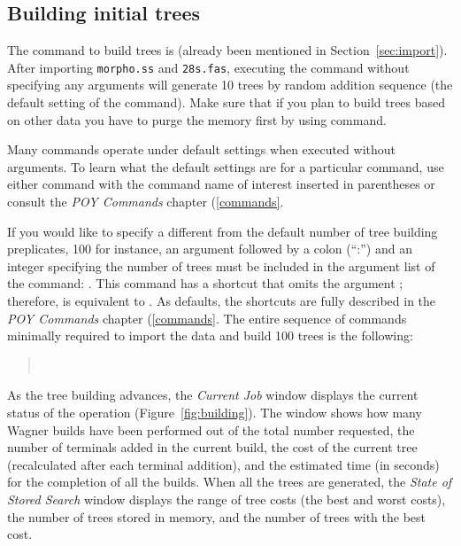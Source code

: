 \subsection{Building initial trees}

The command to build trees is  (already been mentioned in Section~\ref{sec:import}). After importing \texttt{morpho.ss} and \texttt{28s.fas}, executing the command  without specifying any arguments will generate 10 trees by random addition sequence (the default setting of the command). Make sure that if you plan to build trees based on other data you have to purge the memory first by using  command.

Many \poy commands operate under default settings when executed without arguments. To learn what the default settings are for a particular command, use either  command with the command name of interest inserted in parentheses or consult the \emph{POY Commands} chapter (\ref{commands}.

If you would like to specify a different from the default number of tree building preplicates, 100 for instance, an argument  followed by a colon (``:'') and an integer specifying the number of trees must be included in the argument list of the  command: . This command has a shortcut that omits the argument ; therefore,  is equivalent to . As defaults, the shortcuts are fully described in the \emph{POY Commands} chapter (\ref{commands}. The entire sequence of commands minimally required to import the data and build 100 trees is the following:

\begin{quote}
 	\\
\end{quote}

As the tree building advances, the \emph{Current Job} window displays the current status of the operation (Figure~\ref{fig:building}). The window shows how many Wagner builds have been performed out of the total number requested, the number of terminals added in the current build, the cost of the current tree (recalculated after each terminal addition), and the estimated time (in seconds) for the completion of all the builds. When all the trees are generated, the \emph{State of Stored Search} window displays the range of tree costs (the best and worst costs), the number of trees stored in memory, and the number of trees with the best cost.

